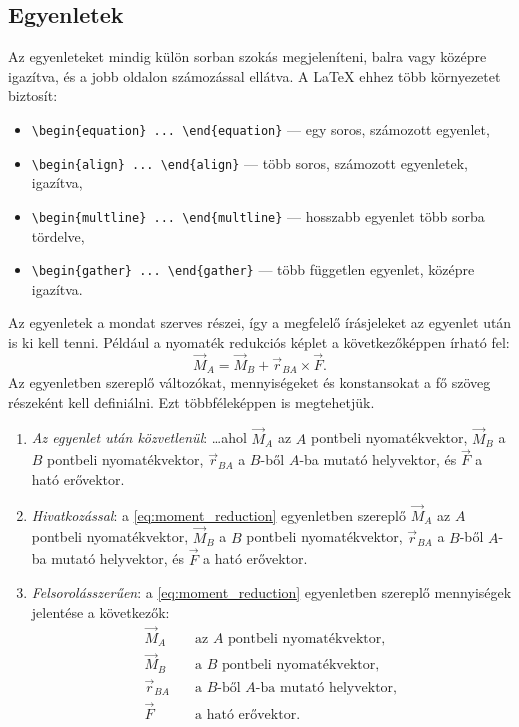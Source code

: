 \documentclass[fleqn,12pt]{article}
\begin{document}
    \subsection{Egyenletek}

        Az egyenleteket mindig külön sorban szokás megjeleníteni, balra vagy középre igazítva, és a jobb oldalon számozással ellátva. A \LaTeX{} ehhez több környezetet biztosít:
        \begin{itemize}
            \item \texttt{\textbackslash begin\{equation\} ... \textbackslash end\{equation\}} --- egy soros, számozott egyenlet,
            \item \texttt{\textbackslash begin\{align\} ... \textbackslash end\{align\}} --- több soros, számozott egyenletek, igazítva,
            \item \texttt{\textbackslash begin\{multline\} ... \textbackslash end\{multline\}} --- hosszabb egyenlet több sorba tördelve,
            \item \texttt{\textbackslash begin\{gather\} ... \textbackslash end\{gather\}} --- több független egyenlet, középre igazítva.
        \end{itemize}

        Az egyenletek a mondat szerves részei, így a megfelelő írásjeleket az egyenlet után is ki kell tenni. Például a nyomaték redukciós képlet a következőképpen írható fel:
        \begin{equation}
            \vec{M}_A = \vec{M}_B + \vec{r}_{BA} \times \vec{F}. \label{eq:moment_reduction}
        \end{equation}
        Az egyenletben szereplő változókat, mennyiségeket és konstansokat a fő szöveg részeként kell definiálni. Ezt többféleképpen is megtehetjük.

        \begin{enumerate}
            \item \emph{Az egyenlet után közvetlenül}: \dots ahol $\vec{M}_A$ az $A$ pontbeli nyomatékvektor, $\vec{M}_B$ a $B$ pontbeli nyomatékvektor, $\vec{r}_{BA}$ a $B$-ből $A$-ba mutató helyvektor, és $\vec{F}$ a ható erővektor. 
            \item \emph{Hivatkozással}: a \eqref{eq:moment_reduction} egyenletben szereplő $\vec{M}_A$ az $A$ pontbeli nyomatékvektor, $\vec{M}_B$ a $B$ pontbeli nyomatékvektor, $\vec{r}_{BA}$ a $B$-ből $A$-ba mutató helyvektor, és $\vec{F}$ a ható erővektor.
            \item \emph{Felsorolásszerűen}: a \eqref{eq:moment_reduction} egyenletben szereplő mennyiségek jelentése a következők:
                \begin{align*}
                    \vec{M}_A &\quad \text{az $A$ pontbeli nyomatékvektor}, \\
                    \vec{M}_B &\quad \text{a $B$ pontbeli nyomatékvektor}, \\
                    \vec{r}_{BA} &\quad \text{a $B$-ből $A$-ba mutató helyvektor}, \\
                    \vec{F} &\quad \text{a ható erővektor}.
                \end{align*}
        \end{enumerate}
\end{document}
